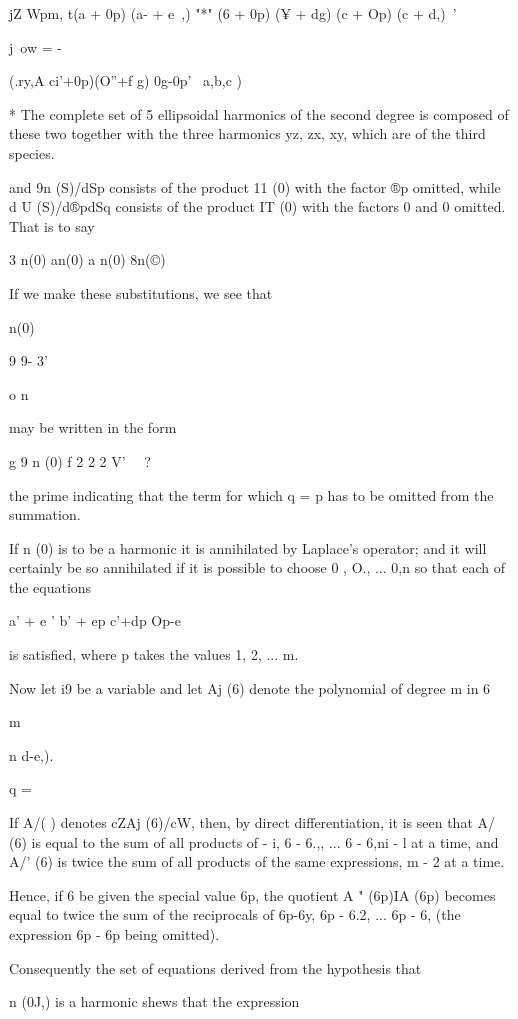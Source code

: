   jZ Wpm, t(a + 0p) (a- + e~,) "*" (6 + 0p) (¥ + dg) (c + Op) (c +
d,)\ '

j\ ow = - 

(.ry,A ci'+0p)(O''+f g) 0g-0p' \ a,b,c )

* The complete set of 5 ellipsoidal harmonics of the second degree is
composed of these two together with the three harmonics yz, zx, xy,
which are of the third species.

%
%

and 9n (S)/dSp consists of the product 11 (0) with the factor ®p
omitted, while d U (S)/d®pdSq consists of the product IT (0) with the
factors 0 and 0 omitted. That is to say

3 n(0) an(0) a n(0) 8n(©)

If we make these substitutions, we see that

n(0)

9 9- 3'

 o n

may be written in the form

g 9 n (0) f 2 2 2 V' \ \ ?\

the prime indicating that the term for which q = p has to be omitted
from the summation.

If n (0) is to be a harmonic it is annihilated by Laplace's operator;
and it will certainly be so annihilated if it is possible to choose 0
, O., ... 0,n so that each of the equations

a' + e ' b' + ep c'+dp Op-e

is satisfied, where p takes the values 1, 2, ... m.

Now let i9 be a variable and let Aj (6) denote the polynomial of
degree m in 6

m

n d-e,).

q = \

If A/( ) denotes cZAj (6)/cW, then, by direct differentiation, it is
seen that A/ (6) is equal to the sum of all products of - i, 6 - 6.,,
... 6 - 6,ni - l at a time, and A/' (6) is twice the sum of all
products of the same expressions, m - 2 at a time.

Hence, if 6 be given the special value 6p, the quotient A " (6p)IA
(6p) becomes equal to twice the sum of the reciprocals of 6p-6y, 6p -
6.2, ... 6p - 6, (the expression 6p - 6p being omitted).

Consequently the set of equations derived from the hypothesis that

n (0J,) is a harmonic shews that the expression

